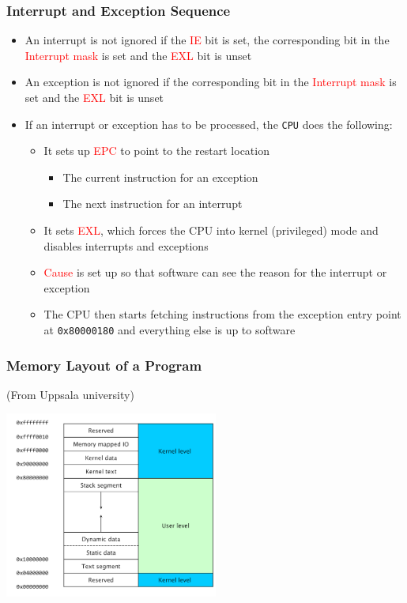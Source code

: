 \documentclass{beamer}
\begin{document}
\begin{frame}%
\frametitle{Interrupt and Exception Sequence}

\begin{itemize}

\item An interrupt is not ignored if the \textcolor{red}{IE} bit is set, the corresponding
  bit in the \textcolor{red}{Interrupt mask} is set and the \textcolor{red}{EXL} bit is unset

\item An exception is not ignored if the corresponding
  bit in the \textcolor{red}{Interrupt mask} is set and the \textcolor{red}{EXL} bit is unset

\item If an interrupt or exception has to be processed, the \texttt{CPU} does the following:
  \begin{itemize}
    \scriptsize

  \item It sets up \textcolor{red}{EPC} to point to the restart location
    \begin{itemize}
      \scriptsize
    \item The current instruction for an exception
    \item The next instruction for an interrupt
  \end{itemize}

\item It sets \textcolor{red}{EXL}, which forces the CPU into kernel (privileged) mode
and disables interrupts and exceptions

\item \textcolor{red}{Cause} is set up so that software can see the reason for the interrupt or exception

\item The CPU then starts fetching instructions from the exception entry point at \texttt{0x80000180}
and everything else is up to software
\end{itemize}

\end{itemize}

\end{frame}


\begin{frame}%
\frametitle{Memory Layout of a Program}
\tiny
(From Uppsala university)

\begin{center}
  \includegraphics[width=7cm]{mips_memory_layout.png}
\end{center}

\end{frame}
\end{document}
